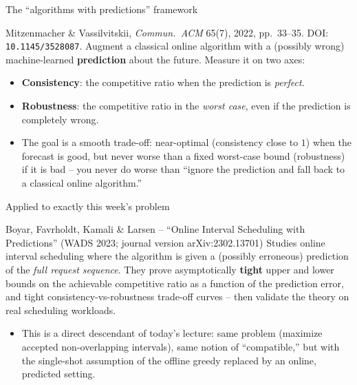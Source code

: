 \documentclass[11pt,aspectratio=169]{beamer}
\begin{document}
\begin{frame}{The ``algorithms with predictions'' framework}
  \begin{block}{Mitzenmacher \& Vassilvitskii, \emph{Commun.\ ACM} 65(7), 2022, pp.\
  33--35. DOI: \texttt{10.1145/3528087}.}
    Augment a classical online algorithm with a (possibly wrong) machine-learned
    \textbf{prediction} about the future. Measure it on two axes:
    \begin{itemize}
      \item \textbf{Consistency}: the competitive ratio when the prediction is
      \emph{perfect}.
      \item \textbf{Robustness}: the competitive ratio in the \emph{worst case}, even
      if the prediction is completely wrong.
    \end{itemize}
  \end{block}
  \begin{itemize}
    \item The goal is a smooth trade-off: near-optimal (consistency close to $1$) when
    the forecast is good, but never worse than a fixed worst-case bound (robustness) if
    it is bad -- you never do worse than ``ignore the prediction and fall back to a
    classical online algorithm.''
  \end{itemize}
\end{frame}

\begin{frame}{Applied to exactly this week's problem}
  \small
  \begin{block}{Boyar, Favrholdt, Kamali \& Larsen -- ``Online Interval Scheduling with
  Predictions'' (WADS 2023; journal version arXiv:2302.13701)}
    Studies online interval scheduling where the algorithm is given a (possibly
    erroneous) prediction of the \emph{full request sequence}. They prove
    asymptotically \textbf{tight} upper and lower bounds on the achievable competitive
    ratio as a function of the prediction error, and tight consistency-vs-robustness
    trade-off curves -- then validate the theory on real scheduling workloads.
  \end{block}
  \begin{itemize}
    \item This is a direct descendant of today's lecture: same problem (maximize
    accepted non-overlapping intervals), same notion of ``compatible,'' but with the
    single-shot assumption of the offline greedy replaced by an online, predicted
    setting.
  \end{itemize}
\end{frame}
\end{document}
